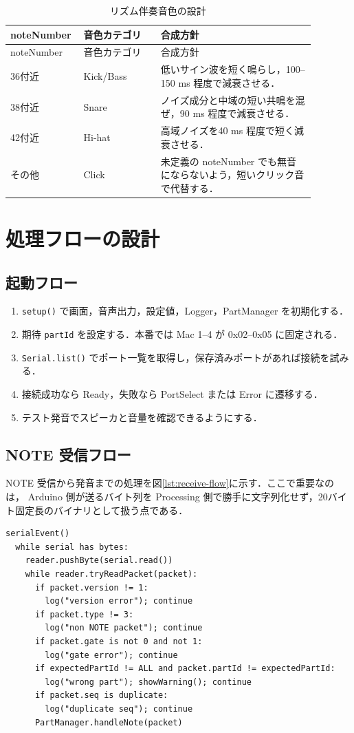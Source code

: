 \documentclass[lualatex,book,openany,paper=a4paper,jafontsize=11.5pt,jafontscale=1.05]{jlreq}
\begin{document}
\begin{longtable}{p{0.16\linewidth}p{0.24\linewidth}p{0.48\linewidth}}
\caption{リズム伴奏音色の設計}\label{tab:rhythm}\\
\hline
noteNumber & 音色カテゴリ & 合成方針 \\
\hline
\endfirsthead
\hline
noteNumber & 音色カテゴリ & 合成方針 \\
\hline
\endhead
36付近 & Kick/Bass & 低いサイン波を短く鳴らし，100--150 ms 程度で減衰させる． \\
\hline
38付近 & Snare & ノイズ成分と中域の短い共鳴を混ぜ，90 ms 程度で減衰させる． \\
\hline
42付近 & Hi-hat & 高域ノイズを40 ms 程度で短く減衰させる． \\
\hline
その他 & Click & 未定義の noteNumber でも無音にならないよう，短いクリック音で代替する． \\
\hline
\end{longtable}

\section{処理フローの設計}

\subsection{起動フロー}
\begin{enumerate}
  \item \texttt{setup()} で画面，音声出力，設定値，Logger，PartManager を初期化する．
  \item 期待 \texttt{partId} を設定する．本番では Mac 1--4 が 0x02--0x05 に固定される．
  \item \texttt{Serial.list()} でポート一覧を取得し，保存済みポートがあれば接続を試みる．
  \item 接続成功なら Ready，失敗なら PortSelect または Error に遷移する．
  \item テスト発音でスピーカと音量を確認できるようにする．
\end{enumerate}

\subsection{NOTE 受信フロー}
NOTE 受信から発音までの処理を図\ref{lst:receive-flow}に示す．ここで重要なのは，
Arduino 側が送るバイト列を Processing 側で勝手に文字列化せず，20バイト固定長のバイナリとして扱う点である．

\begin{lstlisting}[style=pseudo, caption={NOTE 受信から発音までの処理フロー}, label={lst:receive-flow}]
serialEvent()
  while serial has bytes:
    reader.pushByte(serial.read())
    while reader.tryReadPacket(packet):
      if packet.version != 1:
        log("version error"); continue
      if packet.type != 3:
        log("non NOTE packet"); continue
      if packet.gate is not 0 and not 1:
        log("gate error"); continue
      if expectedPartId != ALL and packet.partId != expectedPartId:
        log("wrong part"); showWarning(); continue
      if packet.seq is duplicate:
        log("duplicate seq"); continue
      PartManager.handleNote(packet)
\end{lstlisting}
\end{document}
